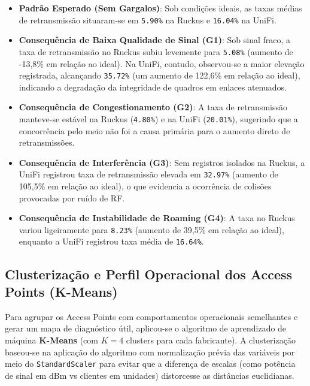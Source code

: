 \begin{itemize}
  \item \textbf{Padrão Esperado (Sem Gargalos)}: Sob condições ideais, as taxas médias de retransmissão situaram-se em \texttt{5.90\%} na Ruckus e \texttt{16.04\%} na UniFi.
  \item \textbf{Consequência de Baixa Qualidade de Sinal (G1)}: Sob sinal fraco, a taxa de retransmissão no Ruckus subiu levemente para \texttt{5.08\%} (aumento de -13,8\% em relação ao ideal). Na UniFi, contudo, observou-se a maior elevação registrada, alcançando \texttt{35.72\%} (um aumento de 122,6\% em relação ao ideal), indicando a degradação da integridade de quadros em enlaces atenuados.
  \item \textbf{Consequência de Congestionamento (G2)}: A taxa de retransmissão manteve-se estável na Ruckus (\texttt{4.80\%}) e na UniFi (\texttt{20.01\%}), sugerindo que a concorrência pelo meio não foi a causa primária para o aumento direto de retransmissões.
  \item \textbf{Consequência de Interferência (G3)}: Sem registros isolados na Ruckus, a UniFi registrou taxa de retransmissão elevada em \texttt{32.97\%} (aumento de 105,5\% em relação ao ideal), o que evidencia a ocorrência de colisões provocadas por ruído de RF.
  \item \textbf{Consequência de Instabilidade de Roaming (G4)}: A taxa no Ruckus variou ligeiramente para \texttt{8.23\%} (aumento de 39,5\% em relação ao ideal), enquanto a UniFi registrou taxa média de \texttt{16.64\%}.


\end{itemize}
\subsection{Clusterização e Perfil Operacional dos Access Points (K-Means)}
\label{subsec:resultados_kmeans}

Para agrupar os Access Points com comportamentos operacionais semelhantes e gerar um mapa de diagnóstico útil, aplicou-se o algoritmo de aprendizado de máquina \textbf{K-Means} (com $K=4$ clusters para cada fabricante). A clusterização baseou-se na aplicação do algoritmo com normalização prévia das variáveis por meio do \texttt{StandardScaler} para evitar que a diferença de escalas (como potência de sinal em dBm vs clientes em unidades) distorcesse as distâncias euclidianas. 

